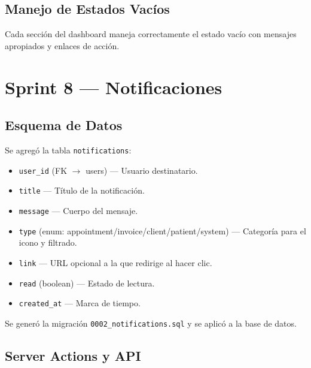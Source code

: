 \documentclass[12pt,a4paper]{article}
\begin{document}
\subsection{Manejo de Estados Vacíos}

Cada sección del dashboard maneja correctamente el estado vacío con mensajes
apropiados y enlaces de acción.

\section{Sprint 8 --- Notificaciones}

\subsection{Esquema de Datos}

Se agregó la tabla \texttt{notifications}:

\begin{itemize}[leftmargin=*]
    \item \texttt{user\_id} (FK $\to$ users) --- Usuario destinatario.
    \item \texttt{title} --- Título de la notificación.
    \item \texttt{message} --- Cuerpo del mensaje.
    \item \texttt{type} (enum: appointment/invoice/client/patient/system) ---
          Categoría para el icono y filtrado.
    \item \texttt{link} --- URL opcional a la que redirige al hacer clic.
    \item \texttt{read} (boolean) --- Estado de lectura.
    \item \texttt{created\_at} --- Marca de tiempo.
\end{itemize}

Se generó la migración \texttt{0002\_notifications.sql} y se aplicó a la base
de datos.

\subsection{Server Actions y API}
\end{document}
